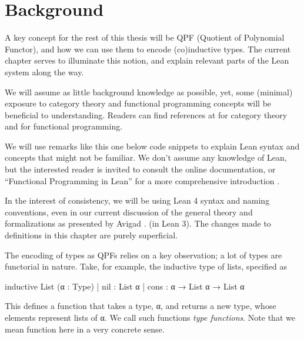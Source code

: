 \chapter{Background}
\label{ch:background}

A key concept for the rest of this thesis will be QPF (Quotient of Polynomial Functor), and how we can use them to encode (co)inductive types. The current chapter serves to illuminate this notion, and explain relevant parts of the Lean system along the way.

We will assume as little background knowledge as possible, yet, some (minimal) exposure to category theory and functional programming concepts will be beneficial to understanding. Readers can find references at \cite{awodeyCategoryTheory2010, milewskiCategoryTheoryProgrammers} for category theory and \cite{christiansenFunctionalProgrammingLean} for functional programming.


\begin{remark}
    We will use remarks like this one below code snippets to explain Lean syntax and concepts that might not be familiar. We don't assume any knowledge of Lean, but the interested reader is invited to consult the online documentation, or ``Functional Programming in Lean'' for a more comprehensive introduction
    \cite{avigadTheoremProvingLean,christiansenFunctionalProgrammingLean}.
\end{remark}

In the interest of consistency, we will be using Lean 4 syntax and naming conventions, even in our
current discussion of the general theory and formalizations as presented by Avigad \etal. (in Lean 3).
The changes made to definitions in this chapter are purely superficial.



The encoding of types as QPFs relies on a key observation; a lot of types are functorial in nature.
Take, for example, the inductive type of lists, specified as
\begin{leancode}
    inductive List (α : Type)
    | nil  : List α
    | cons : α → List α → List α
\end{leancode}

This defines a function  that takes a type, α, and returns a new type, whose elements represent lists of α.
We call such functions \emph{type functions}. Note that we mean function here in a very concrete sense.

